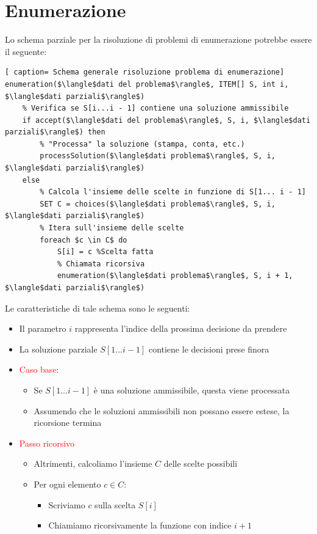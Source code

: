 \documentclass[../cheatSheetAlgoritmi.tex]{subfiles}
\begin{document}
\section{Enumerazione}
Lo schema parziale per la risoluzione di problemi di enumerazione potrebbe essere il seguente: 
 \begin{lstlisting}[ caption= Schema generale risoluzione problema di enumerazione]
enumeration($\langle$dati del problema$\rangle$, ITEM[] S, int i, $\langle$dati parziali$\rangle$)
	% Verifica se S[i...i - 1] contiene una soluzione ammissibile
	if accept($\langle$dati del problema$\rangle$, S, i, $\langle$dati parziali$\rangle$) then
		% "Processa" la soluzione (stampa, conta, etc.)
		processSolution($\langle$dati problema$\rangle$, S, i, $\langle$dati parziali$\rangle$)
	else
		% Calcola l'insieme delle scelte in funzione di S[1... i - 1]
		SET C = choices($\langle$dati problema$\rangle$, S, i, $\langle$dati parziali$\rangle$)
		% Itera sull'insieme delle scelte
		foreach $c \in C$ do
			S[i] = c %Scelta fatta
			% Chiamata ricorsiva
			enumeration($\langle$dati problema$\rangle$, S, i + 1, $\langle$dati parziali$\rangle$)
\end{lstlisting}
Le caratteristiche di tale schema sono le seguenti: 
\begin{itemize}
	\item Il parametro $i$ rappresenta l'indice della prossima decisione da prendere
	\item La soluzione parziale $S[1...i - 1]$ contiene le decisioni prese finora
	\item \textcolor{red}{Caso base}:
	\begin{itemize}
		\item Se $S[1... i - 1]$ è una soluzione ammissibile, questa viene processata
		\item Assumendo che le soluzioni ammissibili non possano essere estese, la ricorsione termina
	\end{itemize}
	\item \textcolor{red}{Passo ricorsivo}
	\begin{itemize}
		\item Altrimenti, calcoliamo l'insieme $C$ delle scelte possibili
		\item Per ogni elemento $c \in C$:
		\begin{itemize}
			\item Scriviamo $c$ sulla scelta $S[i]$
			\item Chiamiamo ricorsivamente la funzione con indice $i+ 1$
		\end{itemize}
	\end{itemize}
\end{itemize}
\end{document}
